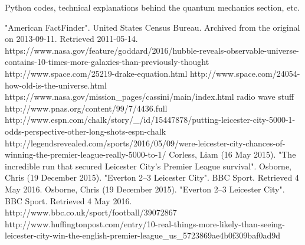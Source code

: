\documentclass[12pt,twoside]{book}
\begin{document}
	\begin{appendices}
		Python codes, technical explanations behind the quantum mechanics section, etc.
	\end{appendices}
	\clearpage
	\begin{thebibliography}{}
		"American FactFinder". United States Census Bureau. Archived from the original on 2013-09-11. Retrieved 2011-05-14. 
		https://www.nasa.gov/feature/goddard/2016/hubble-reveals-observable-universe-contains-10-times-more-galaxies-than-previously-thought
		http://www.space.com/25219-drake-equation.html
		http://www.space.com/24054-how-old-is-the-universe.html
		https://www.nasa.gov/mission\_pages/cassini/main/index.html
		 radio wave stuff
			http://www.pnas.org/content/99/7/4436.full
		http://www.espn.com/chalk/story/\_/id/15447878/putting-leicester-city-5000-1-odds-perspective-other-long-shots-espn-chalk
		http://legendsrevealed.com/sports/2016/05/09/were-leicester-city-chances-of-winning-the-premier-league-really-5000-to-1/
		 Corless, Liam (16 May 2015). "The incredible run that secured Leicester City's Premier League survival".
		Osborne, Chris (19 December 2015). "Everton 2–3 Leicester City". BBC Sport. Retrieved 4 May 2016.
		Osborne, Chris (19 December 2015). "Everton 2–3 Leicester City". BBC Sport. Retrieved 4 May 2016.
		 http://www.bbc.co.uk/sport/football/39072867
		http://www.huffingtonpost.com/entry/10-real-things-more-likely-than-seeing-leicester-city-win-the-english-premier-league\_us\_5723869ae4b0f309baf0ad9d
	\end{thebibliography}
\end{document}

